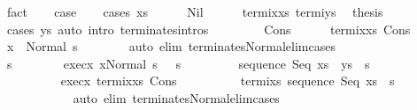 \begin{isabellebody}
\ fact\isanewline
\ \ \isamarkupfalse%
\ {\isacharquery}case\isanewline
\ \ \isamarkupfalse%
\ {\isacharparenleft}cases\ xs{\isacharparenright}\isanewline
\ \ \ \ \isamarkupfalse%
\ Nil\isanewline
\ \ \ \ \isamarkupfalse%
\ termi{\isacharunderscore}x{\isacharunderscore}xs\ termi{\isacharunderscore}ys\ \isamarkupfalse%
\ {\isacharquery}thesis\isanewline
\ \ \ \ \ \ \isamarkupfalse%
\ {\isacharparenleft}cases\ ys{\isacharparenright}\ {\isacharparenleft}auto\ intro{\isacharcolon}\ terminates{\isachardot}intros{\isacharparenright}\isanewline
\ \ \isamarkupfalse%
\isanewline
\ \ \ \ \isamarkupfalse%
\ Cons\isanewline
\ \ \ \ \isamarkupfalse%
\ termi{\isacharunderscore}x{\isacharunderscore}xs\ Cons\ \isanewline
\ \ \ \ \isamarkupfalse%
\ {\isachardoublequoteopen}{\isasymGamma}{\isasymturnstile}x\ {\isasymdown}\ Normal\ s{\isachardoublequoteclose}\isanewline
\ \ \ \ \ \ \isamarkupfalse%
\ {\isacharparenleft}auto\ elim{\isacharcolon}\ terminates{\isacharunderscore}Normal{\isacharunderscore}elim{\isacharunderscore}cases{\isacharparenright}\isanewline
\ \ \ \ \isamarkupfalse%
\ \isanewline
\ \ \ \ \isacommand{{\isacharbraceleft}}\isamarkupfalse%
\isanewline
\ \ \ \ \ \ \isamarkupfalse%
\ s{\isacharprime}\isanewline
\ \ \ \ \ \ \isamarkupfalse%
\ exec{\isacharunderscore}x{\isacharcolon}\ {\isachardoublequoteopen}{\isasymGamma}{\isasymturnstile}{\isasymlangle}x{\isacharcomma}Normal\ s\ {\isasymrangle}\ {\isasymRightarrow}\ s{\isacharprime}{\isachardoublequoteclose}\ \isanewline
\ \ \ \ \ \ \isamarkupfalse%
\ {\isachardoublequoteopen}{\isasymGamma}{\isasymturnstile}sequence\ Seq\ {\isacharparenleft}xs\ {\isacharat}\ ys{\isacharparenright}\ {\isasymdown}\ s{\isacharprime}{\isachardoublequoteclose}\isanewline
\ \ \ \ \ \ \isamarkupfalse%
\ {\isacharminus}\isanewline
\ \ \ \ \ \ \ \ \isamarkupfalse%
\ exec{\isacharunderscore}x\ termi{\isacharunderscore}x{\isacharunderscore}xs\ Cons\isanewline
\ \ \ \ \ \ \ \ \isamarkupfalse%
\ termi{\isacharunderscore}xs{\isacharcolon}\ {\isachardoublequoteopen}{\isasymGamma}{\isasymturnstile}sequence\ Seq\ xs\ {\isasymdown}\ s{\isacharprime}{\isachardoublequoteclose}\isanewline
\ \ \ \ \ \ \ \ \ \ \isamarkupfalse%
\ {\isacharparenleft}auto\ elim{\isacharcolon}\ terminates{\isacharunderscore}Normal{\isacharunderscore}elim{\isacharunderscore}cases{\isacharparenright}\isanewline

\end{isabellebody}
